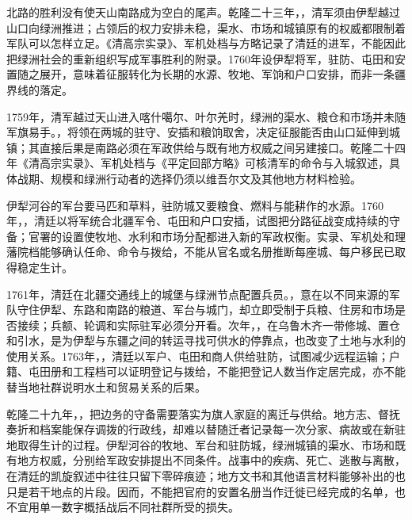 北路的胜利没有使天山南路成为空白的尾声。乾隆二十三年，，清军须由伊犁越过山口向绿洲推进；占领后的权力安排未稳，渠水、市场和城镇原有的权威都限制着军队可以怎样立足。《清高宗实录》、军机处档与方略记录了清廷的进军，不能因此把绿洲社会的重新组织写成军事胜利的附录。1760年设伊犁将军，驻防、屯田和安置随之展开，意味着征服转化为长期的水源、牧地、军饷和户口安排，而非一条疆界线的落定。

1759年，清军越过天山进入喀什噶尔、叶尔羌时，绿洲的渠水、粮仓和市场并未随军旗易手。，将领在两城的驻守、安插和粮饷取舍，决定征服能否由山口延伸到城镇；其直接后果是南路必须在军政供给与既有地方权威之间另建接口。乾隆二十四年《清高宗实录》、军机处档与《平定回部方略》可核清军的命令与入城叙述，具体战期、规模和绿洲行动者的选择仍须以维吾尔文及其他地方材料检验。

伊犁河谷的军台要马匹和草料，驻防城又要粮食、燃料与能耕作的水源。1760年，，清廷以将军统合北疆军令、屯田和户口安插，试图把分路征战变成持续的守备；官署的设置使牧地、水利和市场分配都进入新的军政权衡。实录、军机处和理藩院档能够确认任命、命令与拨给，不能从官名或名册推断每座城、每户移民已取得稳定生计。

1761年，清廷在北疆交通线上的城堡与绿洲节点配置兵员。，意在以不同来源的军队守住伊犁、东路和南路的粮道、军台与城门，却立即受制于兵粮、住房和市场是否接续；兵额、轮调和实际驻军必须分开看。次年，，在乌鲁木齐一带修城、置仓和引水，是为伊犁与东疆之间的转运寻找可供水的停靠点，也改变了土地与水利的使用关系。1763年，，清廷以军户、屯田和商人供给驻防，试图减少远程运输；户籍、屯田册和工程档可以证明登记与拨给，不能把登记人数当作定居完成，亦不能替当地社群说明水土和贸易关系的后果。

乾隆二十九年，，把边务的守备需要落实为旗人家庭的离迁与供给。地方志、督抚奏折和档案能保存调拨的行政线，却难以替随迁者记录每一次分家、病故或在新驻地取得生计的过程。伊犁河谷的牧地、军台和驻防城，绿洲城镇的渠水、市场和既有地方权威，分别给军政安排提出不同条件。战事中的疾病、死亡、逃散与离散，在清廷的凯旋叙述中往往只留下零碎痕迹；地方文书和其他语言材料能够补出的也只是若干地点的片段。因而，不能把官府的安置名册当作迁徙已经完成的名单，也不宜用单一数字概括战后不同社群所受的损失。

